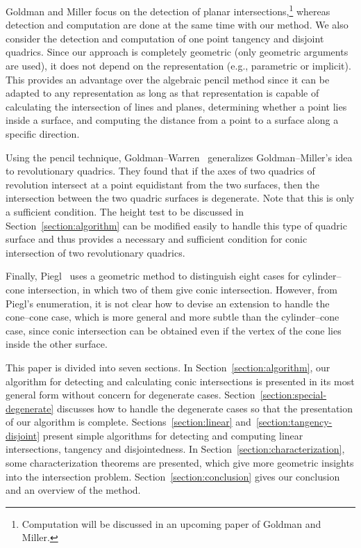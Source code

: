     Goldman and Miller focus on the detection of planar 
intersections,\footnote{Computation will be discussed in an upcoming paper 
of Goldman and Miller.} whereas detection and computation are done at
the same time with our method.   We also consider the detection and computation
of one point tangency and disjoint quadrics.  Since our approach is completely
geometric (only geometric arguments are used), 
it does not depend on the representation 
(e.g., parametric or implicit).  This provides an advantage over the algebraic
pencil method since it can be adapted to any representation as long as that 
representation is capable of calculating the intersection of lines and planes,
determining whether a point lies inside a surface, and computing the distance 
from a point to a surface along a specific direction.

     Using the pencil technique, Goldman--Warren~\cite{goldman-warren:1990}
generalizes Goldman--Miller's idea to revolutionary quadrics.  They found that
if the axes of two quadrics of revolution intersect at a point equidistant
from the two surfaces, then the intersection between the two quadric surfaces
is degenerate.  Note that this is only a sufficient condition.  The height
test to be discussed in Section~\ref{section:algorithm} can be modified
easily to handle this type of quadric surface and thus provides a necessary
and sufficient condition for conic intersection of two revolutionary quadrics.

     Finally, Piegl~\cite{piegl:1989} uses
a geometric method to distinguish eight cases for cylinder--cone intersection,
in which two of them give conic intersection.  However, from Piegl's
enumeration, it is not  clear how to devise an extension to handle
the cone--cone case, which is more general and more subtle than the 
cylinder--cone case, since conic intersection can be obtained even if the 
vertex of the cone lies inside the other surface.

     This paper is divided into seven sections.  
In Section~\ref{section:algorithm}, our algorithm for detecting and 
calculating conic intersections is presented in its most general form without 
concern for degenerate cases.  Section~\ref{section:special-degenerate} 
discusses how to handle the degenerate cases so that the presentation of our 
algorithm is complete.  Sections~\ref{section:linear} 
and~\ref{section:tangency-disjoint} present simple algorithms for detecting
and computing linear intersections, tangency and disjointedness.  
In Section~\ref{section:characterization}, some characterization 
theorems are presented, which give more geometric insights into the 
intersection problem.  Section~\ref{section:conclusion} gives our conclusion 
and an overview of the method.

